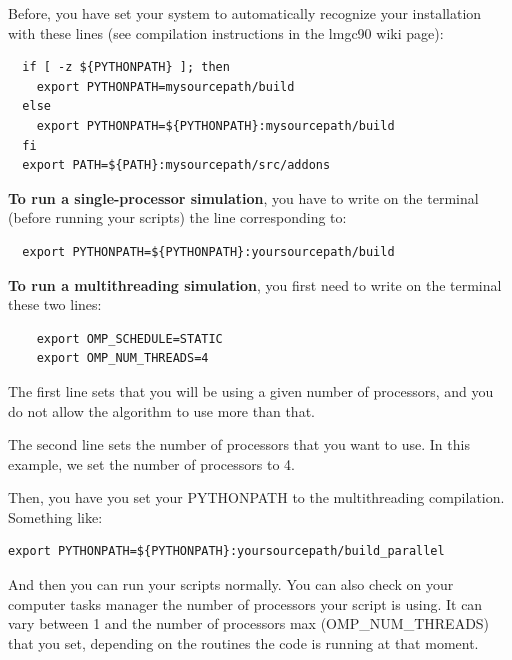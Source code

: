 \documentclass[12pt]{article}
\begin{document}
Before, you have set your system to automatically recognize your installation with these lines (see compilation instructions in the lmgc90 wiki page): 

\begin{tcolorbox}[colback=blue!10]
\begin{verbatim}
  if [ -z ${PYTHONPATH} ]; then
    export PYTHONPATH=mysourcepath/build
  else
    export PYTHONPATH=${PYTHONPATH}:mysourcepath/build
  fi
  export PATH=${PATH}:mysourcepath/src/addons
\end{verbatim}
\end{tcolorbox}

\textbf{To run a single-processor simulation}, you have to write on the terminal (before running your scripts) the line corresponding to: 

\begin{tcolorbox}
\begin{verbatim}
  export PYTHONPATH=${PYTHONPATH}:yoursourcepath/build
\end{verbatim}
\end{tcolorbox}

\textbf{To run a multithreading simulation}, you first need to write on the terminal these two lines:

\begin{tcolorbox}
  \begin{verbatim}
    export OMP_SCHEDULE=STATIC
    export OMP_NUM_THREADS=4
\end{verbatim}
\end{tcolorbox}

The first line sets that you will be using a given number of processors, and you do not allow the algorithm to use more than that. 

The second line sets the number of processors that you want to use. 
In this example, we set the number of processors to 4. 

Then, you have you set your PYTHONPATH to the multithreading compilation. Something like: 

\small
\begin{tcolorbox}
\begin{verbatim}
export PYTHONPATH=${PYTHONPATH}:yoursourcepath/build_parallel
\end{verbatim}
\end{tcolorbox}
\normalsize

And then you can run your scripts normally. 
You can also check on your computer tasks manager the number of processors your script is using. 
It can vary between 1 and the number of processors max (OMP\_NUM\_THREADS) that you set, depending on the routines the code is running at that moment. 
\end{document}
